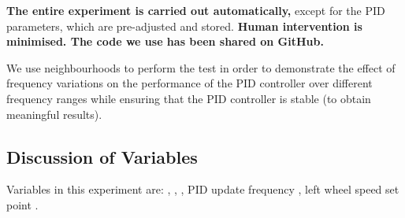 \documentclass[conference]{IEEEtran}
\begin{document}
 \textbf{The entire experiment is carried out automatically,} except for the PID parameters, which are pre-adjusted and stored. \textbf{Human intervention is minimised. The code we use has been shared on GitHub.} 
 
We use neighbourhoods to perform the test in order to demonstrate the effect of frequency variations on the performance of the PID controller over different frequency ranges while ensuring that the PID controller is stable (to obtain meaningful results).

\subsection{Discussion of Variables}
\label{DiscussionOfVariables}
Variables in this experiment are: , , , PID update frequency , left wheel speed set point .
\end{document}

